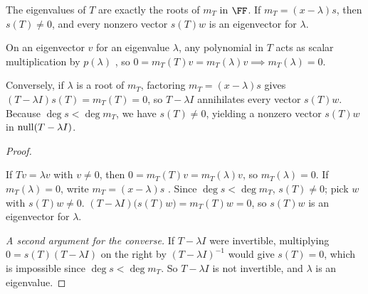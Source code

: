 \documentclass[10pt]{scrartcl}
\begin{document}
\begin{proposition*}\hypertarget{prop-66}{}\label{prop-66}
  The eigenvalues of $T$ are exactly the roots of $m_T$ in $\FF$. If $m_T=(x-\lambda)s$, then $s(T)\ne0$, and every nonzero vector $s(T)w$ is an eigenvector for $\lambda$.
\end{proposition*}
\begin{ideabox}
On an eigenvector $v$ for an eigenvalue $\lambda$, any polynomial in $T$ acts as scalar multiplication by $p(\lambda)$ , so $0=m_T(T)v=m_T(\lambda)v\implies m_T(\lambda)=0$.

Conversely, if $\lambda$ is a root of $m_T$, factoring $m_T=(x-\lambda)s$ gives $(T-\lambda I)s(T)=m_T(T)=0$, so $T-\lambda I$ annihilates every vector $s(T)w$. Because $\deg s<\deg m_T$, we have $s(T)\ne 0$, yielding a nonzero vector $s(T)w$ in $\operatorname{null}(T-\lambda I)$.
\end{ideabox}
\begin{proof}
  \begin{steps}
    \ii If $Tv=\lambda v$ with $v\ne0$, then $0=m_T(T)v=m_T(\lambda)v$, so $m_T(\lambda)=0$.
    \ii If $m_T(\lambda)=0$, write $m_T=(x-\lambda)s$ . Since $\deg s<\deg m_T$, $s(T)\ne0$; pick $w$ with $s(T)w\ne0$.
    \ii $(T-\lambda I)\bigl(s(T)w\bigr)=m_T(T)w=0$, so $s(T)w$ is an eigenvector for $\lambda$.
  \end{steps}
  \emph{A second argument for the converse.} If $T-\lambda I$ were invertible, multiplying $0=s(T)(T-\lambda I)$ on the right by $(T-\lambda I)^{-1}$ would give $s(T)=0$, which is impossible since $\deg s<\deg m_T$. So $T-\lambda I$ is not invertible, and $\lambda$ is an eigenvalue.
\end{proof}
\end{document}

